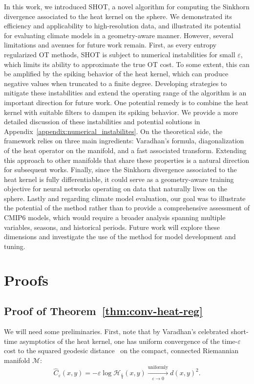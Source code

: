 \documentclass{article}
\theoremstyle{plain}
\theoremstyle{definition}
\theoremstyle{remark}
\newcommand{\M}{\ensuremath{\mathcal{M}}}
\begin{document}
In this work, we introduced \textsc{SHOT}, a novel algorithm for computing the Sinkhorn divergence associated to the heat kernel on the sphere. We demonstrated its efficiency and applicability to high-resolution data, and illustrated its potential for evaluating climate models in a geometry-aware manner. However, several limitations and avenues for future work remain.
First, as every entropy regularized OT methods, \textsc{SHOT} is subject to numerical instabilities for small $\varepsilon$, which limits its ability to approximate the true OT cost. To some extent, this can be amplified by
the spiking behavior of the heat kernel, which can produce negative values when truncated to a finite degree. Developing strategies to mitigate these instabilities and extend the operating range of the algorithm is an important direction for future work. One potential remedy is to combine the heat kernel with suitable filters to dampen its spiking behavior. We provide a more detailed discussion of these instabilities and potential solutions in Appendix~\ref{appendix:numerical_instabilites}. On the theoretical side, the framework relies on three main ingredients: Varadhan's formula, diagonalization of the heat operator on the manifold, and a fast associated transform. Extending this approach to other manifolds that share these properties is a natural direction for subsequent works. Finally, since the Sinkhorn divergence associated to the heat kernel is fully differentiable, it could serve as a geometry-aware training objective for neural networks operating on data that naturally lives on the sphere.
Lastly and regarding climate model evaluation, our goal was to illustrate the potential of the method rather than to provide a comprehensive assessment of CMIP6 models, which would require a broader analysis spanning multiple variables, seasons, and historical periods. Future work will explore these dimensions and investigate the use of the method for model development and tuning.





\appendix

\section{Proofs}
\subsection{Proof of Theorem~\ref{thm:conv-heat-reg}}\label{appendix:proof_convergence}
We will need some preliminaries. First, note that by Varadhan's celebrated short-time asymptotics of the heat kernel, one has uniform convergence of the time-$\varepsilon$ cost to the squared geodesic distance~\cite[Theorem 2.2]{varadhan1967} on the compact, connected Riemannian manifold $\M$:
\[
\widehat C_\varepsilon(x,y) = -\varepsilon \log \mathcal{H}_{\frac{\varepsilon}{4}}(x,y) \xrightarrow[\varepsilon \to 0]{\text{uniformly}} d(x,y)^2.
\]
\end{document}
